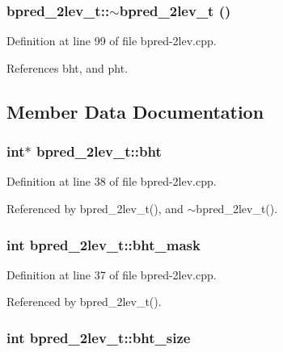 \subsubsection[{$\sim$bpred\_\-2lev\_\-t}]{\setlength{\rightskip}{0pt plus 5cm}bpred\_\-2lev\_\-t::$\sim$bpred\_\-2lev\_\-t ()\hspace{0.3cm}{\tt  [inline]}}\label{classbpred__2lev__t_1ec098743660dc49d988c5fe9e1d1f18}




Definition at line 99 of file bpred-2lev.cpp.

References bht, and pht.

\subsection{Member Data Documentation}
\subsubsection[{bht}]{\setlength{\rightskip}{0pt plus 5cm}int$\ast$ {\bf bpred\_\-2lev\_\-t::bht}\hspace{0.3cm}{\tt  [protected]}}\label{classbpred__2lev__t_cfd3b47e2e9f152c6dcb0d96fb0bd9a5}




Definition at line 38 of file bpred-2lev.cpp.

Referenced by bpred\_\-2lev\_\-t(), and $\sim$bpred\_\-2lev\_\-t().
\subsubsection[{bht\_\-mask}]{\setlength{\rightskip}{0pt plus 5cm}int {\bf bpred\_\-2lev\_\-t::bht\_\-mask}\hspace{0.3cm}{\tt  [protected]}}\label{classbpred__2lev__t_0fa5cebd8ec5232985e71e365b210f1e}




Definition at line 37 of file bpred-2lev.cpp.

Referenced by bpred\_\-2lev\_\-t().
\subsubsection[{bht\_\-size}]{\setlength{\rightskip}{0pt plus 5cm}int {\bf bpred\_\-2lev\_\-t::bht\_\-size}\hspace{0.3cm}{\tt  [protected]}}\label{classbpred__2lev__t_0cbc305b37abbf5bd0d9fa391d374601}




